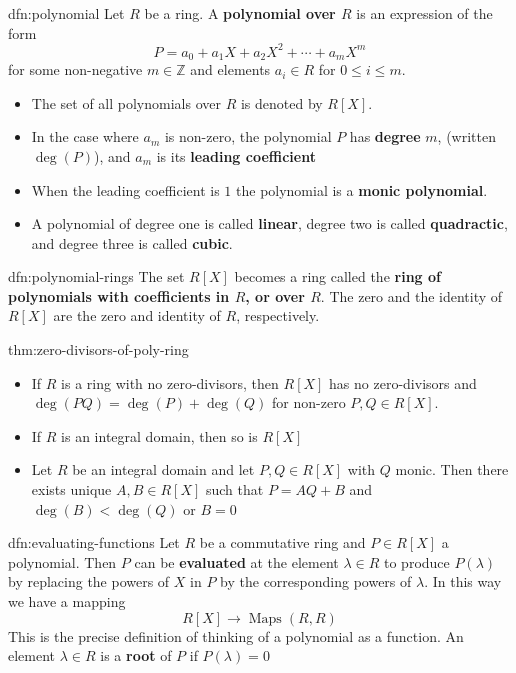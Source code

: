 \documentclass[landscape, 8pt]{extarticle}
\DeclareMathOperator{\Maps}{Maps}
\begin{document}
\begin{multicols}{3}
\begin{dfn}[Polynomial]{dfn:polynomial}{}
    Let $R$ be a ring. A \textbf{polynomial over $R$} is an expression of the form
    \[P = a_{0} + a_{1}X + a_{2}X^{2} + \cdots + a_{m}X^{m}\]
    for some non-negative $m\in \mathbb{Z}$ and elements $a_{i}\in R$ for $0 \le i \le m$. 

    \vspace{-5pt}
    \begin{itemize}[leftmargin=*]
        \setlength\itemsep{0em}
        \item The set of all polynomials over $R$ is denoted by $R[X]$.
        \item In the case where $a_{m}$ is non-zero, the polynomial $P$ has \textbf{degree} $m$, (written $\deg(P)$), and $a_{m}$ is its \textbf{leading coefficient}
        \item When the leading coefficient is $1$ the polynomial is a \textbf{monic polynomial}.
        \item A polynomial of degree one is called \textbf{linear}, degree two is called \textbf{quadractic}, and degree three is called \textbf{cubic}.
    \end{itemize}
\end{dfn}

\begin{dfn}{dfn:polynomial-rings}{}
    The set $R[X]$ becomes a ring called the \textbf{ring of polynomials with coefficients in $R$, or over $R$}. The zero and the identity of $R[X]$ are the zero and identity of $R$, respectively.
\end{dfn}


\begin{thm}{thm:zero-divisors-of-poly-ring}{}
    \begin{itemize}[leftmargin=*]
        \setlength\itemsep{0em}
        \item If $R$ is a ring with no zero-divisors, then $R[X]$ has no zero-divisors and $\deg(PQ) = \deg(P) + \deg(Q)$ for non-zero $P,Q\in R[X]$.
        \item If $R$ is an integral domain, then so is $R[X]$
        \item Let $R$ be an integral domain and let $P, Q\in R[X]$ with $Q$ monic. Then there exists unique $A,B\in R[X]$ such that $P = AQ + B$ and $\deg(B) < \deg(Q)$ or $B = 0$
    \end{itemize}
\end{thm}

\begin{dfn}{dfn:evaluating-functions}{}
    Let $R$ be a commutative ring and $P\in R[X]$ a polynomial. Then $P$ can be \textbf{evaluated} at the element $\lambda\in R$ to produce $P(\lambda)$ by replacing the powers of $X$ in $P$ by the corresponding powers of $\lambda$. In this way we have a mapping
    \[R[X] \to \Maps(R, R)\]
    This is the precise definition of thinking of a polynomial as a function. An element $\lambda\in R$ is a \textbf{root} of $P$ if $P(\lambda) = 0$


\end{dfn}
\end{multicols}
\end{document}
